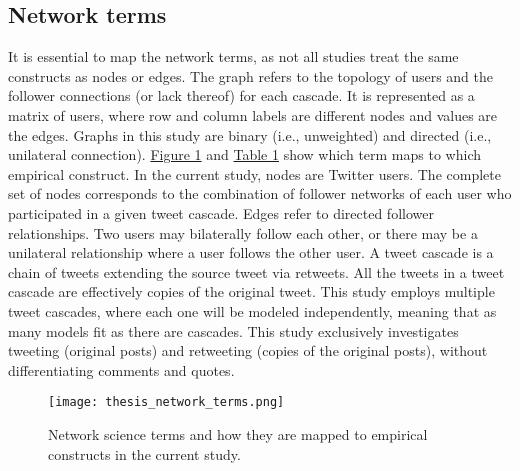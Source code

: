 \documentclass[11pt,a4paper]{article}
\begin{document}
    \subsection{Network terms}
    \hypertarget{sec:network-terms}{}
    
    It is essential to map the network terms, as not all studies treat the same constructs as nodes or edges. The graph refers to the topology of users and the follower connections (or lack thereof) for each cascade. It is represented as a matrix of users, where row and column labels are different nodes and values are the edges. Graphs in this study are binary (i.e., unweighted) and directed (i.e., unilateral connection). \hyperlink{fig:figure1}{Figure 1} and \hyperlink{fig:table1}{Table 1} show which term maps to which empirical construct. In the current study, nodes are Twitter users. The complete set of nodes corresponds to the combination of follower networks of each user who participated in a given tweet cascade. Edges refer to directed follower relationships. Two users may bilaterally follow each other, or there may be a unilateral relationship where a user follows the other user. A tweet cascade is a chain of tweets extending the source tweet via retweets. All the tweets in a tweet cascade are effectively copies of the original tweet. This study employs multiple tweet cascades, where each one will be modeled independently, meaning that as many models fit as there are cascades. This study exclusively investigates tweeting (original posts) and retweeting (copies of the original posts), without differentiating comments and quotes.\\   
    
\begin{figure}[H]
    \hypertarget{fig:figure1}{}
    \centering
    \texttt{[image: thesis\_network\_terms.png]}\\
    \caption{Network science terms and how they are mapped to empirical constructs in the current study.}        
    \label{fig:enter-label}
\end{figure}
\end{document}
